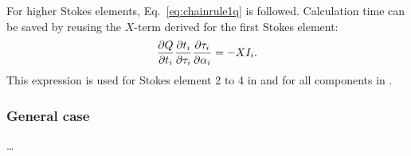 For higher Stokes elements, Eq.~\ref{eq:chainrule1q} is followed. Calculation
time can be saved by reusing the $X$-term derived for the first Stokes element:
\begin{equation}
  \frac{\partial Q}{\partial t_{i}}
  \frac{\partial t_{i}}{\partial\tau_{i}}
  \frac{\partial\tau_{i}}{\partial{\alpha}_{i}}
    = -X I_{i}.
\end{equation}
This expression is used for Stokes element 2 to 4 in
 and for all components in
.


\subsubsection{General case}
%
\dots

